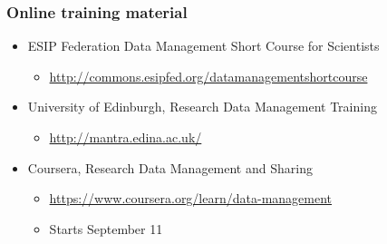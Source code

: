 \documentclass{beamer}
\begin{document}
%  

\begin{frame}
  \frametitle{Online training material}
  
  \begin{itemize}
  \item ESIP Federation Data Management Short Course for Scientists 
  \begin{itemize}
  \item \url{http://commons.esipfed.org/datamanagementshortcourse}
  \end{itemize}
  \item University of Edinburgh, Research Data Management Training
  \begin{itemize}
  \item \url{http://mantra.edina.ac.uk/}
  \end{itemize}
  \item Coursera, Research Data Management and Sharing
  \begin{itemize}
  \item \url{https://www.coursera.org/learn/data-management}
  \item Starts September 11
  \end{itemize}
  \end{itemize}
\end{frame}
\end{document}
